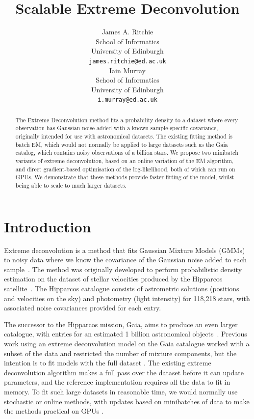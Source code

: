 \documentclass{article}
\title{Scalable Extreme Deconvolution}
\author{
  James A. Ritchie\\
  School of Informatics\\
  University of Edinburgh\\
   \texttt{james.ritchie@ed.ac.uk} \\
  \And
  Iain Murray\\
  School of Informatics\\
  University of Edinburgh\\
   \texttt{i.murray@ed.ac.uk} \\
}
\begin{document}
\maketitle

\begin{abstract}

The Extreme Deconvolution method fits a probability density to a dataset where every observation has Gaussian noise added with a known sample-specific covariance, originally intended for use with astronomical datasets.
The existing fitting method is batch EM, which would not normally be applied to large datasets such as the Gaia catalog, which contains noisy observations of a billion stars.
We propose two minibatch variants of extreme deconvolution, based on an online variation of the EM algorithm, and direct gradient-based optimisation of the log-likelihood, both of which can run on GPUs.
We demonstrate that these methods provide faster fitting of the model, whilst being able to scale to much larger datasets.

\end{abstract}

\section{Introduction}

Extreme deconvolution is a method that fits Gaussian Mixture Models (GMMs) to noisy data where we know the covariance of the Gaussian noise added to each sample~\cite{bovyExtremeDeconvolutionInferring2011}.
The method was originally developed to perform probabilistic density estimation on the dataset of stellar velocities produced by the Hipparcos satellite~\cite{perrymanHipparcosCatalogue1997}.
The Hipparcos catalogue consists of astrometric solutions (positions and velocities on the sky) and photometry (light intensity) for 118,218 stars, with associated noise covariances provided for each entry.

The successor to the Hipparcos mission, Gaia, aims to produce an even larger catalogue, with entries for an estimated 1 billion astronomical objects~\cite{collaborationGaiaMission2016}.
Previous work using an extreme deconvolution model on the Gaia catalogue %
worked with a subset of the data and restricted the number of mixture components,
but the intention is to fit models with the full dataset
\cite{andersonImprovingGaiaParallax2018}.
The existing extreme deconvolution algorithm makes a full pass over the dataset before it can update parameters, and the reference implementation requires all the data to fit in memory. To fit such large datasets in reasonable time, we would normally use stochastic or online methods, with updates based on minibatches of data to make the methods practical on GPUs \cite{bottou2018}.
\end{document}
